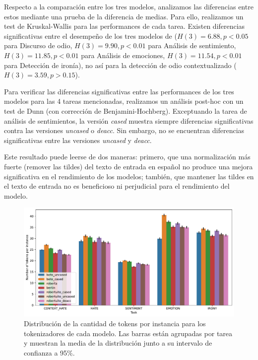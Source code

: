 Respecto a la comparación entre los tres modelos, analizamos las diferencias entre estos mediante una prueba de la diferencia de medias. Para ello, realizamos un test de Kruskal-Wallis \cite{kruskal1952use} para las performances de cada tarea. Existen diferencias significativas entre el desempeño de los tres modelos de \robertuito{} ($ H (3) = 6.88, p < 0.05 $ para Discurso de odio, $ H (3) = 9.90 , p < 0.01 $ para Análisis de sentimiento, $ H (3) = 11.85, p <0.01 $ para Análisis de emociones, $ H (3) = 11.54, p <0.01 $ para Detección de ironía), no así para la detección de odio contextualizado ($H(3)=3.59, p > 0.15$).

Para verificar las diferencias significativas entre las performances de los tres modelos para las 4 tareas mencionadas, realizamos un análisis post-hoc con un test de Dunn (con corrección de Benjamini-Hochberg).  Exceptuando la tarea de análisis de sentimientos, la versión \emph{cased} muestra siempre diferencias significativas contra las versiones \emph{uncased} o \emph{deacc}. Sin embargo, no se encuentran diferencias significativas entre las versiones \emph{uncased} y \emph{deacc}.

Este resultado puede leerse de dos maneras: primero, que una normalización más fuerte (remover las tildes) del texto de entrada en español no produce una mejora significativa en el rendimiento de los modelos; también, que mantener las tildes en el texto de entrada no es beneficioso ni perjudicial para el rendimiento del modelo.

\begin{figure}
    \centering
    \includegraphics[width=\textwidth]{img/robertuito/length_tokens.pdf}
    \caption{Distribución de la cantidad de tokens por instancia para los tokenizadores de cada modelo. Las barras están agrupadas por tarea y muestran la media de la distribución junto a su intervalo de confianza a 95\%.}
    \label{fig:length_tokens}
\end{figure}

